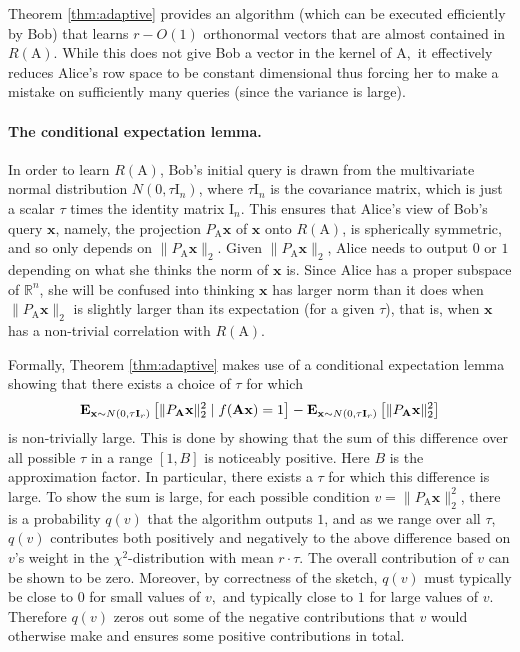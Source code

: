 \documentclass[11pt]{article}
\newcommand{\mat}[1]{{\ensuremath{\bm{\mathrm{#1}}}}}
\def\matA{\mat{A}}
\def\matI{\mat{I}}
\def\x{{\mathbf x}}
\begin{document}
Theorem \ref{thm:adaptive} provides 
an algorithm (which can be executed efficiently by Bob) that learns
$r-O(1)$ orthonormal vectors that are almost contained in $R(\matA).$ While this
does not give Bob a vector in the kernel of $\matA,$ it effectively reduces
Alice's row space to be constant dimensional thus forcing her to make a
mistake on sufficiently many queries (since the variance is large). 

\paragraph{The conditional expectation lemma.}
In order to learn $R(\matA)$, Bob's initial query is drawn from the multivariate
normal distribution $N(0, \tau \matI_{n})$, where $\tau \matI_{n}$ is the covariance
matrix, which is just a scalar $\tau$ times the identity matrix $\matI_{n}$.  This
ensures that Alice's view of Bob's query $\x$, namely, the projection $P_{\matA}\x$ of
$\x$ onto $R(\matA)$, is spherically symmetric, and so only depends on
$\|P_{\matA}\x\|_2$. Given $\|P_{\matA}\x\|_2$, Alice needs to output $0$ or $1$ depending
on what she thinks the norm of $\x$ is. Since Alice has a
proper subspace of $\mathbb{R}^n$, she will be confused into thinking $\x$ has
larger norm than it does when $\|P_{\matA}\x\|_2$ is slightly larger than its
expectation (for a given $\tau$), that is, when $\x$ has a non-trivial
correlation with $R(\matA)$. 

Formally, Theorem \ref{thm:adaptive} makes use of a conditional expectation
lemma showing that there exists a choice of $\tau$ for which 
$${\bf E}_{\x \sim N(0, \tau \matI_{r})} \left [ \|P_{\matA}\x\|_2^2 \mid f(\matA\x) = 1 \right] 
- {\bf E}_{\x \sim N(0, \tau \matI_{r})} \left[ \|P_{\matA}\x\|_2^2 \right]$$ 
is non-trivially large. This is done by showing that the sum of this
difference over all possible $\tau$ in a range $[1, B]$ is noticeably
positive. Here $B$ is the approximation factor. 
In particular, there exists a $\tau$ for which this difference is
large. To show the sum is large, for each possible condition $v =
\|P_{\matA}\x\|_2^2$, there is a probability $q(v)$ that the algorithm outputs $1$,
and as we range over all $\tau$, $q(v)$ contributes both positively and
negatively to the above difference based on $v$'s weight in the $\chi^2$-distribution 
with mean $r \cdot \tau$. The overall contribution of $v$ can be shown to be
zero. Moreover, by correctness of the sketch, $q(v)$ must typically be close to $0$ for
small values of $v,$ and typically close to $1$ for large values of $v.$ 
Therefore $q(v)$ zeros out some of the negative contributions that $v$ would otherwise
make and ensures some positive contributions in total.
\end{document}
